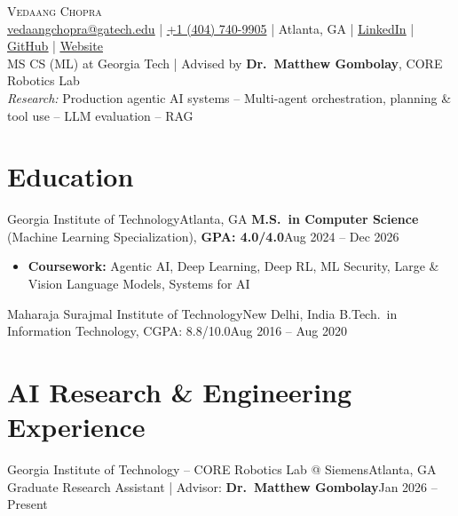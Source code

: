 \documentclass[letterpaper,11pt]{article}
\begin{document}
\begin{center}
  {\Huge \scshape Vedaang Chopra} \\ \vspace{2pt}
  \small
  \href{mailto:vedaangchopra@gatech.edu}{\underline{vedaangchopra@gatech.edu}} \;|\;
  \underline{+1 (404) 740-9905} \;|\;
  Atlanta, GA \;|\;
  \href{https://linkedin.com/in/vedaang-chopra}{\underline{LinkedIn}} \;|\;
  \href{https://github.com/Vedaang-Chopra}{\underline{GitHub}} \;|\;
  \href{https://vedaangchopra.live/}{\underline{Website}}
  \\ \vspace{3pt}
  \small
  MS CS (ML) at Georgia Tech \;|\; Advised by \textbf{Dr.\ Matthew Gombolay}, CORE Robotics Lab \\
  \textit{Research:} Production agentic AI systems -- Multi-agent orchestration, planning \& tool use -- LLM evaluation -- RAG
\end{center}
\vspace{-6pt}

\vspace{-6pt}
\section{Education}
\resumeSubHeadingListStart
\resumeSubheading
{Georgia Institute of Technology}{Atlanta, GA}
{\textbf{M.S.\ in Computer Science} (Machine Learning Specialization), \textbf{GPA: 4.0/4.0}}{Aug 2024 -- Dec 2026}
\vspace{-3pt}
\begin{itemize}[leftmargin=0.20in, topsep=0pt, itemsep=0pt]
  \item\footnotesize{\textbf{Coursework:} Agentic AI, Deep Learning, Deep RL, ML Security, Large \& Vision Language Models, Systems for AI}
\end{itemize}
\vspace{-6pt}
\resumeEducationCompact
{Maharaja Surajmal Institute of Technology}{New Delhi, India}
{B.Tech.\ in Information Technology, CGPA: 8.8/10.0}{Aug 2016 -- Aug 2020}
\resumeSubHeadingListEnd

\section{AI Research \& Engineering Experience}
\resumeSubHeadingListStart
\resumeSubheading
{Georgia Institute of Technology -- CORE Robotics Lab @ Siemens}{Atlanta, GA}
{Graduate Research Assistant \;|\; Advisor: \textbf{Dr.\ Matthew Gombolay}}{Jan 2026 -- Present}
\resumeItemListStart
\end{document}
